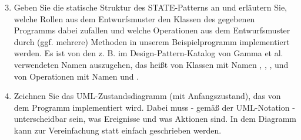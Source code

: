 \documentclass{lehramt-informatik}
\begin{document}
\begin{enumerate}
\setcounter{enumi}{2}


\item Geben Sie die statische Struktur des STATE-Patterns an und
erläutern Sie, welche Rollen aus dem Entwurfsmuster den Klassen des
gegebenen Programms dabei zufallen und welche Operationen aus dem
Entwurfsmuster durch (ggf. mehrere) Methoden in unserem Beispielprogramm
implementiert werden. Es ist von den z. B. im Design-Pattern-Katalog von
Gamma et al. verwendeten Namen auszugehen, das heißt von Klassen mit
Namen , , ,
 und von Operationen mit Namen  und
.

\item Zeichnen Sie das UML-Zustandsdiagramm (mit Anfangszustand), das
von dem Programm implementiert wird. Dabei muss - gemäß der UML-Notation
- unterscheidbar sein, was Ereignisse und was Aktionen sind. In dem
Diagramm kann zur Vereinfachung statt 
einfach  geschrieben werden.

\end{enumerate}

\literatur
\end{document}
